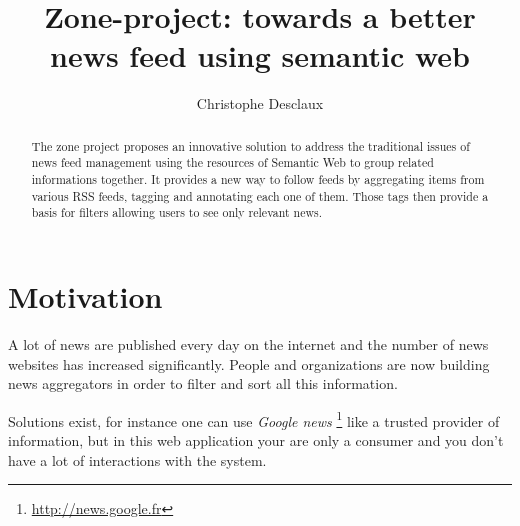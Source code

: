 \documentclass{llncs}
\begin{document}
%
\frontmatter          %
%
\pagestyle{headings}  %
%

\mainmatter              %
%
\title{Zone-project: towards a better news feed using semantic web}
%
%
\author{Christophe Desclaux}
%
%
%

\maketitle

\begin{abstract}%
The zone project proposes an innovative solution to address the traditional issues of news feed management using the resources of Semantic Web to group related informations together.
It provides a new way to follow feeds by aggregating items from various RSS feeds, tagging and annotating each one of them. Those tags then provide a basis for filters allowing users to see only relevant news.


{}
\end{abstract}
%
\section{Motivation}
%
A lot of news are published every day on the internet and the number of news websites has increased significantly. People and organizations are now building news aggregators in order to filter and sort all this information.

Solutions exist, for instance one can use \textsl{Google news} \footnote{\url{http://news.google.fr}} like a trusted provider of information, but in this web application your are only a consumer and you don't have a lot of interactions with the system. 
\end{document}
